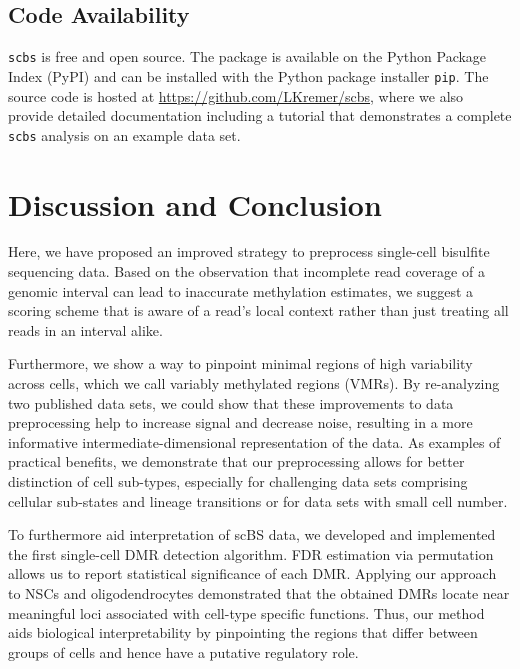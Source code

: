 \documentclass[twocolumn,10pt]{article}
\begin{document}
\subsection{Code Availability}

\texttt{scbs} is free and open source.
The package is available on the Python Package Index (PyPI) and can be installed with the Python package installer \texttt{pip}.
The source code is hosted at \href{https://github.com/LKremer/scbs}{https://github.com/LKremer/scbs}, where we also provide detailed documentation including a tutorial that demonstrates a complete \texttt{scbs} analysis on an example data set.


\section{Discussion and Conclusion}

Here, we have proposed an improved strategy to preprocess single-cell bisulfite sequencing data.
Based on the observation that incomplete read coverage of a genomic interval can lead to inaccurate methylation estimates, we suggest a scoring scheme that is aware of a read's local context rather than just treating all reads in an interval alike.

Furthermore, we show a way to pinpoint minimal regions of high variability across cells, which we call variably methylated regions (VMRs).
By re-analyzing two published data sets, we could show that these improvements to data preprocessing help to increase signal and decrease noise, resulting in a more informative intermediate-dimensional representation of the data.
As examples of practical benefits, we demonstrate that our preprocessing allows for better distinction of cell sub-types, especially for challenging data sets comprising cellular sub-states and lineage transitions or for data sets with small cell number.

To furthermore aid interpretation of scBS data, we developed and implemented the first single-cell DMR detection algorithm.
FDR estimation via permutation allows us to report statistical significance of each DMR.
Applying our approach to NSCs and oligodendrocytes demonstrated that the obtained DMRs locate near meaningful loci associated with cell-type specific functions.
Thus, our method aids biological interpretability by pinpointing the regions that differ between groups of cells and hence have a putative regulatory role.
\end{document}
